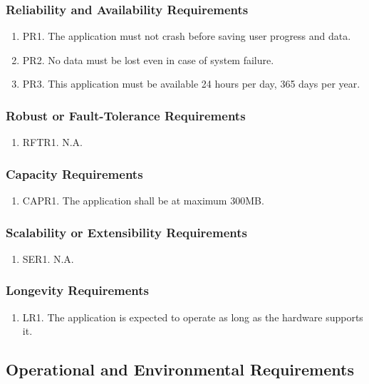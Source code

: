 \documentclass[]{article}
\begin{document}
\subsubsection{Reliability and Availability Requirements}
\begin{enumerate}
	\item PR1. The application must not crash before saving user progress and data.
	\item PR2. No data must be lost even in case of system failure.
	\item PR3. This application must be available 24 hours per day, 365 days per year. 
\end{enumerate}

\subsubsection{Robust or Fault-Tolerance Requirements}
\begin{enumerate}
	\item RFTR1. N.A.
\end{enumerate}

\subsubsection{Capacity Requirements}
\begin{enumerate}
	\item CAPR1. The application shall be at maximum 300MB.
\end{enumerate}

\subsubsection{Scalability or Extensibility Requirements}
\begin{enumerate}
	\item SER1. N.A.
\end{enumerate}

\subsubsection{Longevity Requirements}
\begin{enumerate}
	\item LR1. The application is expected to operate as long as the hardware supports it.
\end{enumerate}

\subsection{Operational and Environmental Requirements}
\end{document}
